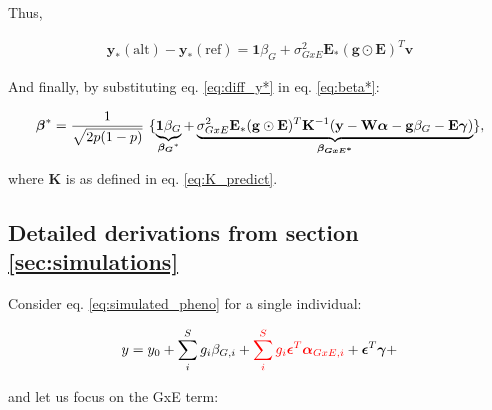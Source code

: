 

Thus,

\begin{align}\label{eq:diff_y*}
    \mathbf{y}_*(\mathrm{alt}) - \mathbf{y}_*(\mathrm{ref}) = \mathbf{1}\beta_G + \sigma_{GxE}^2\mathbf{E}_*(\mathbf{g}\odot\mathbf{E})^T \mathbf{v}
\end{align}

And finally, by substituting eq. \eqref{eq:diff_y*} in eq. \eqref{eq:beta*}:

\begin{align}
    \bfbeta^* = \frac{1}{\sqrt{2p(1-p)}} \ \{\underbrace{\mathbf{1}\beta_G}_{\boldsymbol{\beta_G}^*} + \underbrace{\sigma_{GxE}^2\mathbf{E}_*(\mathbf{g}\odot\mathbf{E})^T \mathbf{K}^{-1}(\mathbf{y}-\mathbf{W}\bfalpha - \bfg \beta_G - \mathbf{E} \boldsymbol{\gamma})}_{\boldsymbol{\beta_{GxE^*}}}\},
\end{align}

where $\mathbf{K}$ is as defined in eq. \eqref{eq:K_predict}.


\newpage

\subsection{Detailed derivations from section \ref{sec:simulations}}
\label{sec:derivations_simul}

Consider eq. \eqref{eq:simulated_pheno} for a single individual:

\begin{align}
    y = y_0 + \sum_i^S g_i \beta_{G,i} + \textcolor{red}{\sum_i^S g_i \boldsymbol{\epsilon}^T\boldsymbol{\alpha}_{GxE,i}} +  \boldsymbol{\epsilon}^T \boldsymbol{\gamma} + 
\end{align}

and let us focus on the GxE term:

